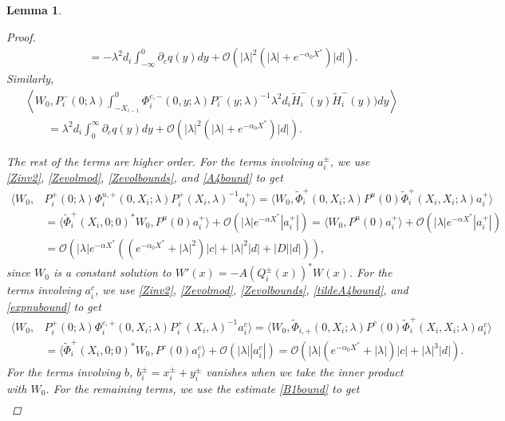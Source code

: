 \documentclass[12pt]{elsarticle}
\theoremstyle{plain}
\newtheorem{lemma}[theorem]{Lemma}
\theoremstyle{definition}
\theoremstyle{remark}
\numberwithin{theorem}{section}
\numberwithin{equation}{section}
\begin{document}
\begin{lemma}
\begin{proof}
\begin{equation*}
\begin{aligned}
&\qquad= -\lambda^2 d_i \int_{-\infty}^0 \partial_c q(y)dy + \mathcal{O}(|\lambda|^2 (|\lambda| + e^{- \alpha_0 X^*}) |d|).
\end{aligned}
\end{equation*}
Similarly, 
\begin{align*}
&\left\langle W_0, P_i^-(0; \lambda) \int_{-X_{i-1}}^0 \Phi_i^{c,-}(0, y; \lambda) P_i^-(y; \lambda)^{-1} \lambda^2 d_i \tilde{H}_i^-(y) \tilde{H}_i^-(y)) dy  \right\rangle \\
&\qquad= \lambda^2 d_i \int_0^{\infty} \partial_c q(y)dy + \mathcal{O}(|\lambda|^2 (|\lambda| + e^{- \alpha_0 X^*}) |d|).
\end{align*}

The rest of the terms are higher order. For the terms involving $a_i^\pm$, we use \cref{Zinv2}, \cref{Zevolmod}, \cref{Zevolbounds}, and \cref{A4bound} to get
\begin{align*}
\langle W_0, &P_i^+(0; \lambda) \Phi_i^{u,+}(0, X_i; \lambda) P_i^+(X_i, \lambda)^{-1} a_i^+ \rangle = \langle W_0, \tilde{\Phi}_i^+(0, X_i; \lambda) 
P^u(0) \tilde{\Phi}_i^+(X_i, X_i; \lambda)a_i^+ \rangle \\
&= \langle \tilde{\Phi}_i^+(X_i, 0; 0)^* W_0, P^u(0) a_i^+ \rangle + \mathcal{O}(|\lambda|e^{-\alpha X^*}|a_i^+|) = \langle W_0, P^u(0) a_i^+ \rangle + \mathcal{O}(|\lambda|e^{-\alpha X^*}|a_i^+|) \\
&= \mathcal{O}\left(|\lambda|e^{-\alpha X^*} \left( (e^{-\alpha_0 X^*} + |\lambda|^2) |c| + |\lambda|^2 |d| + |D||d| \right) \right),
\end{align*}
since $W_0$ is a constant solution to $W'(x) = -A(Q_i^\pm(x))^* W(x)$. For the terms involving $a_i^c$, we use \cref{Zinv2}, \cref{Zevolmod}, \cref{Zevolbounds}, \cref{tildeA4bound}, and \cref{expnubound} to get
\begin{align*}
\langle W_0, &P_i^+(0; \lambda) \Phi_i^{c,+}(0, X_i; \lambda) P_i^+(X_i, \lambda)^{-1} a_i^c \rangle = \langle W_0, \tilde{\Phi}_{i,+}(0, X_i; \lambda) 
P^c(0) \tilde{\Phi}_i^{+}(X_i, X_i; \lambda)a_i^c \rangle \\
&= \langle \tilde{\Phi}_i^+(X_i, 0; 0)^* W_0, P^c(0) a_i^c \rangle + \mathcal{O}(|\lambda||a_i^c|) = \mathcal{O}\left( |\lambda| (e^{-\alpha_0 X^*} + |\lambda|) |c| +|\lambda|^3 |d| \right).
\end{align*}
For the terms involving $b$, $b_i^\pm = x_i^\pm + y_i^\pm$ vanishes when we take the inner product with $W_0$. For the remaining terms, we use the estimate \cref{B1bound} to get
\begin{align*}

\end{align*}
\end{proof}
\end{lemma}
\end{document}
